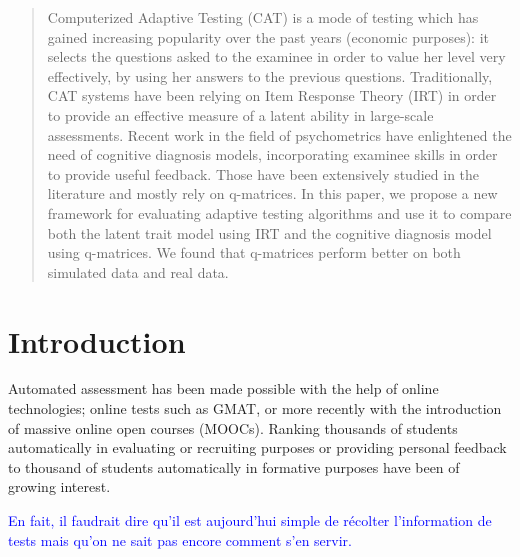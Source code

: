 \documentclass{sig-alternate}
\newcommand\note[1]{\textcolor{blue}{#1}}
\begin{document}
\maketitle
\begin{abstract}
Computerized Adaptive Testing (CAT) is a mode of testing which has gained increasing popularity over the past years (economic purposes): it selects the questions asked to the examinee in order to value her level very effectively, by using her answers to the previous questions.
Traditionally, CAT systems have been relying on Item Response Theory (IRT) in order to provide an effective measure of a latent ability in large-scale assessments.
Recent work in the field of psychometrics have enlightened the need of cognitive diagnosis models, incorporating examinee skills in order to provide useful feedback. Those have been extensively studied in the literature and mostly rely on q-matrices.
In this paper, we propose a new framework for evaluating adaptive testing algorithms and use it to compare both the latent trait model using IRT and the cognitive diagnosis model using q-matrices.
We found that q-matrices perform better on both simulated data and real data.
\end{abstract}




\section{Introduction}
Automated assessment has been made possible with the help of online technologies; online tests such as GMAT, or more recently with the introduction of massive online open courses (MOOCs). Ranking thousands of students automatically in evaluating or recruiting purposes or providing personal feedback to thousand of students automatically in formative purposes have been of growing interest.

\note{En fait, il faudrait dire qu'il est aujourd'hui simple de récolter l'information de tests mais qu'on ne sait pas encore comment s'en servir.}
\end{document}
